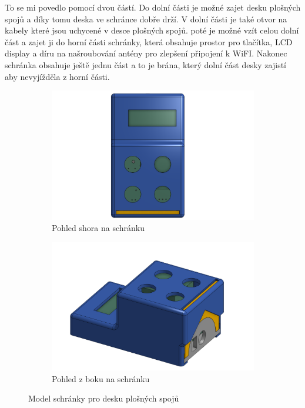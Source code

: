 To se mi povedlo pomocí dvou částí. Do dolní části je možné zajet desku plošných spojů a díky tomu deska ve schránce dobře drží. V dolní části je také otvor na kabely které jsou uchycené v desce plošných spojů. poté je možné vzít celou dolní část a zajet ji do horní části schránky, která obsahuje prostor pro tlačítka, LCD display a díru na našroubování antény pro zlepšení připojení k WiFI. Nakonec schránka obsahuje ještě jednu část a to je brána, který dolní část desky zajistí aby nevyjížděla z horní části. 

\begin{figure}[H]
    \centering
    \begin{subfigure}[t]{0.48\textwidth}
        \includegraphics[width=\textwidth]{images/krabickaTop.png}
        \caption{Pohled shora na schránku}
        \label{fig:krabickaTop}
    \end{subfigure}%
    \hfill
    \begin{subfigure}[t]{0.48\textwidth}
        \includegraphics[width=\textwidth]{images/KrabickaZBoku.png}
        \caption{Pohled z boku na schránku}
        \label{fig:KrabickaZBoku}
    \end{subfigure}
    \caption{Model schránky pro desku plošných spojů}
    \label{fig:krabickaObaPohledy}
\end{figure}

